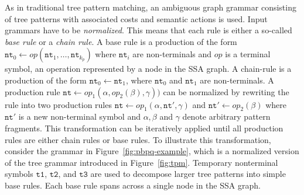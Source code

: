 As in traditional tree pattern matching, an ambiguous graph grammar
consisting of tree patterns with associated costs and semantic actions
is used. Input grammars have to be \emph{normalized}. This means that
each rule is either a so-called \emph{base rule} or a \emph{chain
  rule}. A base rule is a production of the form $\texttt{nt}_0
\leftarrow \textit{op} ( \texttt{nt}_1, \dots, \texttt{nt}_{k_p} )$
where $\texttt{nt}_i$ are non-terminals and $\textit{op}$ is a
terminal symbol, \ie an operation represented by a node in the SSA
graph. A chain-rule is a production of the form $\texttt{nt}_0
\leftarrow \texttt{nt}_1$, where $\texttt{nt}_0$ and $\texttt{nt}_1$
are non-terminals.  A production rule $\texttt{nt} \leftarrow
\textit{op}_1 ( \alpha, \textit{op}_2 (\beta), \gamma))$ can be
normalized by rewriting the rule into two production rules
$\texttt{nt} \leftarrow \textit{op}_1 ( \alpha, \texttt{nt}' ,
\gamma)$ and $\texttt{nt}' \leftarrow \textit{op}_2 ( \beta)$ where
$\texttt{nt}'$ is a new non-terminal symbol and $\alpha,\beta$ and
$\gamma$ denote arbitrary pattern fragments.  This transformation can
be iteratively applied until all production rules are either chain
rules or base rules.  To illustrate this transformation, consider the
grammar in Figure~\ref{fig:pbpq-example}, which is a normalized
version of the tree grammar introduced in
Figure~\ref{fig:tpm}. Temporary nonterminal symbols $\texttt{t1}$,
$\texttt{t2}$, and $\texttt{t3}$ are used to decompose larger tree
patterns into simple base rules. Each base rule spans across a single
node in the SSA graph.


